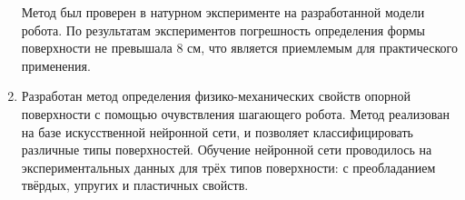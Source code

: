 \begin{enumerate}
 Метод был проверен в натурном эксперименте на разработанной модели робота. По результатам экспериментов погрешность определения формы поверхности не превышала 8 см, что является приемлемым для практического применения.
  \item Разработан метод определения физико-механических свойств опорной поверхности с помощью очувствления шагающего робота. Метод реализован на базе искусственной нейронной сети, и позволяет классифицировать различные типы поверхностей. Обучение нейронной сети проводилось на экспериментальных данных для трёх типов поверхности: с преобладанием твёрдых, упругих и пластичных свойств.
\end{enumerate}